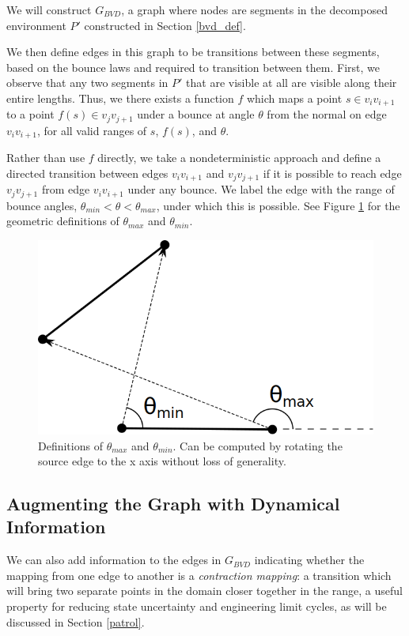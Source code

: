 \documentclass[]{styles/svproc}  %
\begin{document}
We will construct $G_{BVD}$, a graph where nodes are segments in the decomposed
environment $P'$ constructed in Section \ref{bvd_def}.

We then define edges in this graph to be transitions between these segments, based on the bounce laws and
required to transition between them. First, we observe that any two segments in
$P'$ that are visible at all are visible along their entire lengths. Thus, we
there exists a function $f$ which maps a point $s \in v_i
v_{i+1}$ to a point $f(s) \in v_j v_{j+1}$ under a bounce at angle $\theta$ from
the normal on edge $v_i v_{i+1}$, for all valid ranges of $s$, $f(s)$, and
$\theta$.

Rather than use $f$ directly, we take a nondeterministic approach and define a
directed transition between edges $v_i v_{i+1}$ and $v_j v_{j+1}$ if it is
possible to reach edge $v_j v_{j+1}$ from edge $v_i v_{i+1}$ under any bounce.
We label the edge with the range of bounce angles, $\theta_{min} < \theta <
\theta_{max}$, under which this is possible. See Figure \ref{fig:bounce_range} for
the geometric definitions of $\theta_{max}$ and $\theta_{min}$.

\begin{figure}
    \includegraphics[width=0.8\linewidth]{figures/bouncerange.png}
    \centering
    \caption{Definitions of $\theta_{max}$ and $\theta_{min}$. Can be computed
by rotating the source edge to the x axis without loss of generality.}\label{fig:bounce_range}
    \centering
\end{figure}

\subsection{Augmenting the Graph with Dynamical Information}

We can also add information to the edges in $G_{BVD}$ indicating whether the
mapping from one edge to another is a \emph{contraction mapping}: a transition
which will bring two separate points in the domain closer together in the range,
a useful property for reducing state uncertainty and engineering limit cycles,
as will be discussed in Section \ref{patrol}.
\end{document}
